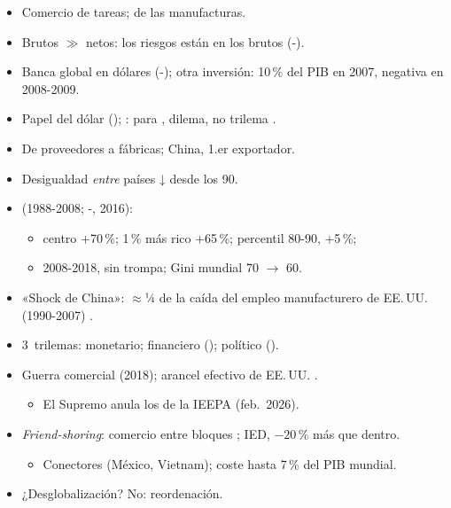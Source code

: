 \documentclass{article}
\begin{document}
\begin{columnas}
\begin{itemize}
\item Comercio de tareas;  de las manufacturas.
\end{itemize}
\begin{itemize}
\item Brutos $\gg$ netos: los riesgos están en los brutos (-).
\item Banca global en dólares (-); otra inversión: 10\,\% del PIB en 2007, negativa en 2008-2009.
\item Papel del dólar (); : para , dilema, no trilema .
\end{itemize}
\begin{itemize}
\item De proveedores a fábricas; China, 1.er exportador.
\item Desigualdad \emph{entre} países ↓ desde los 90.
\end{itemize}
\begin{itemize}
\item {} (1988-2008; -, 2016):
  \begin{itemize}
  \item centro +70\,\%; 1\,\% más rico +65\,\%; percentil 80-90, +5\,\%;
  \item 2008-2018, sin trompa; Gini mundial 70 $\to$ 60.
  \end{itemize}
\item «Shock de China»: $\approx$¼ de la caída del empleo manufacturero de EE.\,UU. (1990-2007) .
\end{itemize}
\begin{itemize}
\item 3~trilemas: monetario; financiero (); político ().
\item Guerra comercial (2018); arancel efectivo de EE.\,UU. .
  \begin{itemize}
  \item El Supremo anula los de la IEEPA (feb.\ 2026).
  \end{itemize}
\item \emph{Friend-shoring}: comercio entre bloques ; IED, $-20$\,\% más que dentro.
  \begin{itemize}
  \item Conectores (México, Vietnam); coste hasta 7\,\% del PIB mundial.
  \end{itemize}
\item ¿Desglobalización? No: reordenación.
\end{itemize}


\end{columnas}
\end{document}
